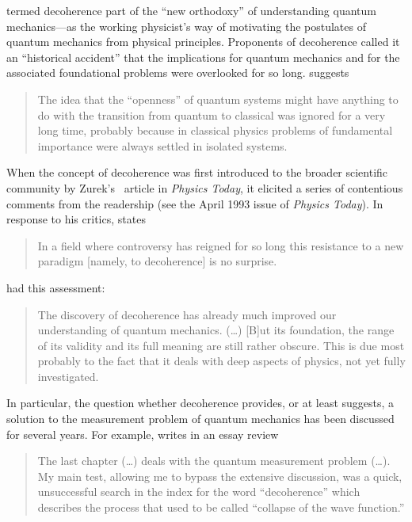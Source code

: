 \documentclass[rmp,aps,amsmath,amsfonts,noshowkeys,noshowpacs,12pt]{revtex4}
\begin{document}
\citet{Bub:1997:iq} termed decoherence part of the ``new orthodoxy''
of understanding quantum mechanics---as the working physicist's way of
motivating the postulates of quantum mechanics from physical
principles. Proponents of decoherence called it an ``historical
accident'' \citep[p.~13]{Joos:1999:po} that the implications for
quantum mechanics and for the associated foundational problems were
overlooked for so long.  \citet[][p.~717]{Zurek:2002:ii} suggests
%
\begin{quote}
  {\small The idea that the ``openness'' of quantum systems might have
  anything to do with the transition from quantum to classical was
  ignored for a very long time, probably because in classical physics
  problems of fundamental importance were always settled in isolated
  systems.}
\end{quote}
%
When the concept of decoherence was first introduced to the broader
scientific community by Zurek's~\citeyearpar{Zurek:1991:vv} article in
\emph{Physics Today}, it elicited a series of contentious comments
from the readership (see the April 1993 issue of \emph{Physics
  Today}). In response to his critics, \citet[p.~718]{Zurek:2002:ii}
states
%
\begin{quote} {\small 
    In a field where controversy has reigned for so long this
    resistance to a new paradigm [namely, to decoherence] is no
    surprise.}
\end{quote}
%
\citet[p.~2]{Omnes:2003:tt} had this assessment:
%
\begin{quote} {\small
    The discovery of decoherence has already much improved our
    understanding of quantum mechanics. (\dots) [B]ut its foundation,
    the range of its validity and its full meaning are still rather
    obscure. This is due most probably to the fact that it deals with
    deep aspects of physics, not yet fully investigated.}
\end{quote}
%
In particular, the question whether decoherence provides, or at least
suggests, a solution to the measurement problem of quantum mechanics
has been discussed for several years. For example,
\citet[p.~492]{Anderson:2001:rc} writes in an essay review
%
\begin{quote} {\small 
    The last chapter (\dots) deals with the quantum measurement
    problem (\dots).  My main test, allowing me to bypass the
    extensive discussion, was a quick, unsuccessful search in the
    index for the word ``decoherence'' which describes the process
    that used to be called ``collapse of the wave function.''}
\end{quote} 
\end{document}
